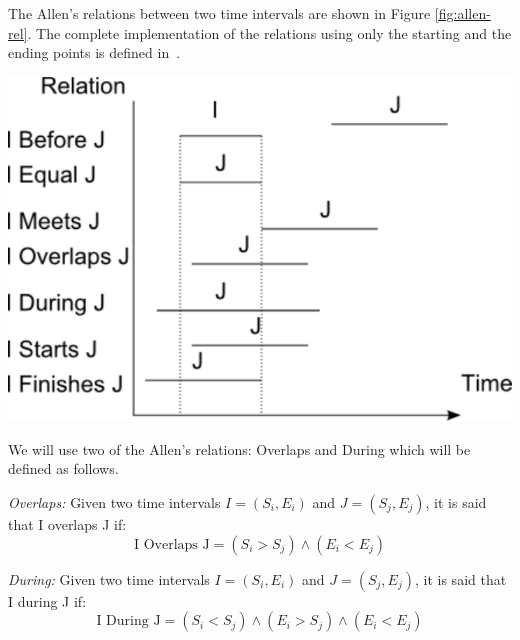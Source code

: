 The Allen's relations between two time intervals are shown in Figure \ref{fig:allen-rel}. The complete implementation of the relations using only the starting and the ending points is defined in~\cite{Nagypal2003}.

\begin{samepage}
\vspace*{13pt}
\begin{center}
{
\includegraphics[scale=0.5]{./graphs/allen.pdf}

}
\end{center}
\vspace*{10pt}
\vspace*{13pt}
\end{samepage}

We will use two of the Allen's relations: Overlaps and During which will be defined as follows.

\begin{definition}
\emph{Overlaps:}
 \label{def:overlaps}
Given two time intervals $I = \left(S_i, E_i \right)$ and $J = \left(S_j, E_j\right)$, it is said that I overlaps J if:
\begin{equation}
 \label{eqn:overlaps}
\text{I Overlaps J}  = \left(S_i > S_j  \right) \wedge \left(E_i < E_j  \right) 
\end{equation}
\end{definition}
  

\begin{definition}
\emph{During:}
 \label{def:during}
Given two time intervals $I = \left(S_i, E_i \right)$ and $J = \left(S_j, E_j\right)$, it is said that I during J if:
\begin{equation}
 \label{eqn:during}
\text{I During J}  = \left(S_i < S_j  \right) \wedge \left(E_i > S_j  \right) \wedge \left(E_i < E_j \right)
\end{equation}
\end{definition}

